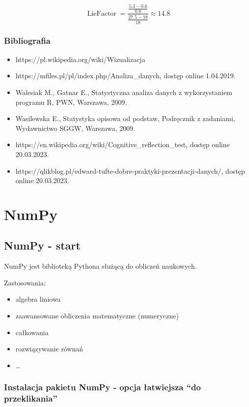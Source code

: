 \documentclass[
  letterpaper,
  DIV=11,
  numbers=noendperiod]{scrreprt}
\providecommand{\tightlist}{%
  \setlength{\itemsep}{0pt}\setlength{\parskip}{0pt}}\usepackage{longtable,booktabs,array}
\begin{document}
\[\operatorname{LieFactor} = \frac{\frac{5.3-0.6}{0.6}}{\frac{27.5-18}{18}} \approx 14.8\]

\section{Bibliografia}\label{bibliografia-1}

\begin{itemize}
\tightlist
\item
  https://pl.wikipedia.org/wiki/Wizualizacja
\item
  https://mfiles.pl/pl/index.php/Analiza\_danych, dostęp online
  1.04.2019.
\item
  Walesiak M., Gatnar E., Statystyczna analiza danych z wykorzystaniem
  programu R, PWN, Warszawa, 2009.
\item
  Wasilewska E., Statystyka opisowa od podstaw, Podręcznik z zadaniami,
  Wydawnictwo SGGW, Warszawa, 2009.
\item
  https://en.wikipedia.org/wiki/Cognitive\_reflection\_test, dostęp
  online 20.03.2023.
\item
  https://qlikblog.pl/edward-tufte-dobre-praktyki-prezentacji-danych/,
  dostęp online 20.03.2023.
\end{itemize}

\part{NumPy}

\chapter{NumPy - start}\label{numpy---start}

NumPy jest biblioteką Pythona służącą do obliczeń naukowych.

Zastosowania:

\begin{itemize}
\tightlist
\item
  algebra liniowa
\item
  zaawansowane obliczenia matematyczne (numeryczne)
\item
  całkowania
\item
  rozwiązywanie równań
\item
  \ldots{}
\end{itemize}

\section{Instalacja pakietu NumPy - opcja łatwiejsza ``do
przeklikania''}\label{instalacja-pakietu-numpy---opcja-ux142atwiejsza-do-przeklikania}
\end{document}
